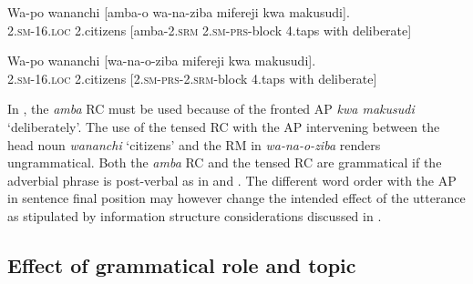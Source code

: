 \documentclass[output=paper,colorlinks,citecolor=brown]{langscibook}
\begin{document}
\z

\ea%
    \label{ex:mwamzandi:23}
    \gll    Wa-po wananchi [amba-o wa-na-ziba mifereji kwa makusudi].\\
            \textsc{2.sm-16.loc} 2.citizens [amba\textsc{-2.srm} \textsc{2.sm-prs-}block  4.taps with deliberate]\\
\z

\ea%
    \label{ex:mwamzandi:24}
    \gll    Wa-po wananchi [wa-na-o-ziba mifereji kwa makusudi].\\
            \textsc{2.sm-16.loc} 2.citizens [\textsc{2.sm-prs-2.srm-}block 4.taps with deliberate]\\
\z

In , the \textit{amba} RC must be used because of the fronted AP \textit{kwa makusudi} ‘deliberately’. The use of the tensed RC with the AP intervening between the head noun \textit{wananchi} ‘citizens’ and the RM in \textit{wa-na-o-ziba} renders  ungrammatical. Both the \textit{amba} RC and the tensed RC are grammatical if the adverbial phrase is post-verbal as in  and . The different word order with the AP in sentence final position may however change the intended effect of the utterance as stipulated by information structure considerations discussed in .

\subsection{Effect of grammatical role and topic}\label{sec:mwamzandi:4.3}
\end{document}
